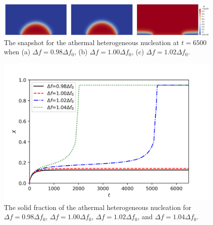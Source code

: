 \documentclass[preprint,12pt]{elsarticle}
\begin{document}
%
\begin{center}
\begin{figure} 
\begin{centering}
\includegraphics[scale=0.65]{snapshot_athermal.PNG}
\par\end{centering}
\caption{The snapshot for the athermal heterogeneous nucleation at $t=6500$ when (a) $\Delta f=0.98\Delta f_0$, (b) $\Delta f=1.00\Delta f_0$, (c) $\Delta f=1.02\Delta f_0$.} \label{fig:snapshot_athermal}
\end{figure}
\par\end{center}
%
%
\begin{center}
\begin{figure} 
\begin{centering}
\includegraphics[scale=0.65]{solid_fraction_athermal.PNG}
\par\end{centering}
\caption{The solid fraction of the athermal heterogeneous nucleation for $\Delta f=0.98\Delta f_0$, $\Delta f=1.00\Delta f_0$, $\Delta f=1.02\Delta f_0$, and $\Delta f=1.04\Delta f_0$.} \label{fig:solid_fraction_athermal}
\end{figure}
\par\end{center}
%
%
\end{document}
